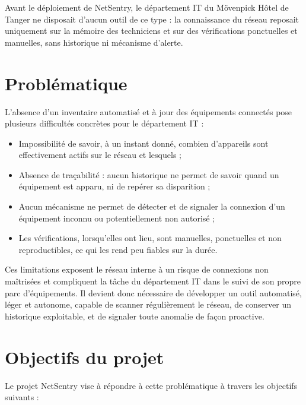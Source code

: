 Avant le déploiement de NetSentry, le département IT du Mövenpick Hôtel de Tanger ne
disposait d'aucun outil de ce type : la connaissance du réseau reposait uniquement sur la
mémoire des techniciens et sur des vérifications ponctuelles et manuelles, sans
historique ni mécanisme d'alerte.

\section{Problématique}

L'absence d'un inventaire automatisé et à jour des équipements connectés pose plusieurs
difficultés concrètes pour le département IT :

\begin{itemize}
    \item Impossibilité de savoir, à un instant donné, combien d'appareils sont
    effectivement actifs sur le réseau et lesquels ;
    \item Absence de traçabilité : aucun historique ne permet de savoir quand un
    équipement est apparu, ni de repérer sa disparition ;
    \item Aucun mécanisme ne permet de détecter et de signaler la connexion d'un
    équipement inconnu ou potentiellement non autorisé ;
    \item Les vérifications, lorsqu'elles ont lieu, sont manuelles, ponctuelles et non
    reproductibles, ce qui les rend peu fiables sur la durée.
\end{itemize}

Ces limitations exposent le réseau interne à un risque de connexions non maîtrisées et
compliquent la tâche du département IT dans le suivi de son propre parc d'équipements. Il
devient donc nécessaire de développer un outil automatisé, léger et autonome, capable de
scanner régulièrement le réseau, de conserver un historique exploitable, et de signaler
toute anomalie de façon proactive.

\section{Objectifs du projet}

Le projet NetSentry vise à répondre à cette problématique à travers les objectifs
suivants :

